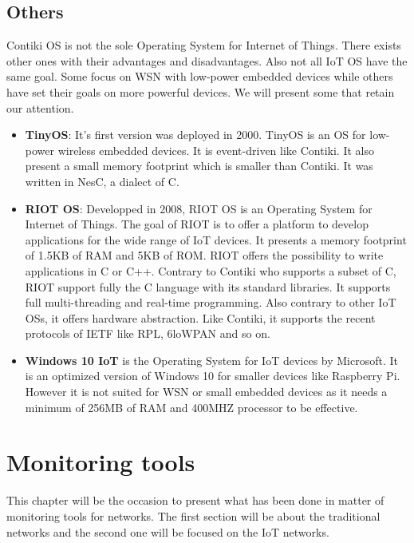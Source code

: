\section{Others}

Contiki OS is not the sole Operating System for Internet of Things. There exists other ones with their advantages and disadvantages. Also not all IoT OS have the same goal. Some focus on WSN with low-power embedded devices while others have set their goals on more powerful devices. We will present some that retain our attention.

\begin{itemize}
\item \textbf{TinyOS}: It's first version was deployed in 2000. TinyOS \cite{website:tinyos} is an OS for low-power wireless embedded devices. It is event-driven like Contiki. It also present a small memory footprint which is smaller than Contiki. It was written in NesC, a dialect of C.
\item \textbf{RIOT OS}: Developped in 2008, RIOT OS \cite{website:riot} \cite{baccelli2013riot} is an Operating System for Internet of Things. The goal of RIOT is to offer a platform to develop applications for the wide range of IoT devices. It presents a memory footprint of 1.5KB of RAM and 5KB of ROM. RIOT offers the possibility to write applications in C or C++. Contrary to Contiki who supports a subset of C, RIOT support fully the C language with its standard libraries. It supports full multi-threading and real-time programming. Also contrary to other IoT OSs, it offers hardware abstraction. Like Contiki, it supports the recent protocols of IETF like RPL, 6loWPAN and so on.
\item \textbf{Windows 10 IoT} \cite{website:win10} is the Operating System for IoT devices by Microsoft. It is an optimized version of Windows 10 for smaller devices like Raspberry Pi. However it is not suited for WSN or small embedded devices as it needs a minimum of 256MB of RAM and 400MHZ processor to be effective.
\end{itemize}

\chapter{Monitoring tools}

This chapter will be the occasion to present what has been done in matter of monitoring tools for networks. The first section will be about the traditional networks and the second one will be focused on the IoT networks.


